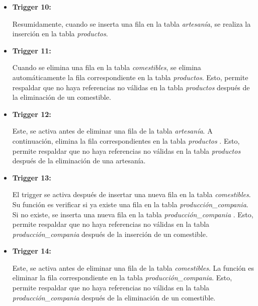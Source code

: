 \documentclass[11pt]{report}
\begin{document}
\begin{itemize}
      \item \textbf{Trigger 10:}
            \lstset{style=mystyle}
            

            Resumidamente, cuando se inserta una fila en la tabla \emph{artesanía}, se realiza la inserción en la tabla \emph{productos}.

      \item \textbf{Trigger 11:}
            \lstset{style=mystyle}
            

            Cuando se elimina una fila en la tabla \emph{comestibles}, se elimina automáticamente la fila correspondiente en la tabla \emph{productos}. Esto, permite respaldar que no haya referencias no válidas en la tabla \emph{productos} después de la eliminación de un comestible.

      \item \textbf{Trigger 12:}
            \lstset{style=mystyle}
            

            Este, se activa antes de eliminar una fila de la tabla \emph{artesanía}. A continuación, elimina la fila correspondientes en la tabla \emph{productos }. Esto, permite respaldar que no haya referencias no válidas en la tabla \emph{productos} después de la eliminación de una artesanía.

      \item \textbf{Trigger 13:}
            \lstset{style=mystyle}
            

            El trigger se activa después de insertar una nueva fila en la tabla \emph{comestibles}. Su función es verificar si ya existe una fila en la tabla \emph{producción\_compania}. Si no existe, se inserta una nueva fila en la tabla \emph{producción\_compania} . Esto, permite respaldar que no haya referencias no válidas en la tabla \emph{producción\_compania} después de la inserción de un comestible.

      \item \textbf{Trigger 14:}
            \lstset{style=mystyle}
            

            Este, se activa antes de eliminar una fila de la tabla \emph{comestibles}. La función es eliminar la fila correspondiente en la tabla \emph{producción\_compania}. Esto, permite respaldar que no haya referencias no válidas en la tabla \emph{producción\_compania} después de la eliminación de un comestible.


\end{itemize}
\end{document}
